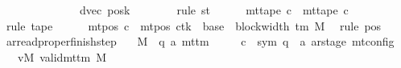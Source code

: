 \begin{isabellebody}
\ \ \ \ \ \ \ \ \ \ \ \ \ \ dvec{\isacharcomma}{\kern0pt}\ {\isacharquery}{\kern0pt}posk{\isacharprime}{\kern0pt}{\isacharparenright}{\kern0pt}{\isachardoublequoteclose}\isanewline
\ \ \ \ \ \ \isamarkupfalse%
\ {\isacharparenleft}{\kern0pt}rule\ st{}{\isacharprime}{\kern0pt}{\isacharparenright}{\kern0pt}\isanewline
\ \ \ \ \isamarkupfalse%
\ {\isachardoublequoteopen}mt{\isacharunderscore}{\kern0pt}tape\ c{}\ {\isacharequal}{\kern0pt}\ mt{\isacharunderscore}{\kern0pt}tape\ c{\isacharprime}{\kern0pt}{\isachardoublequoteclose}\ \isamarkupfalse%
\ {\isacharparenleft}{\kern0pt}rule\ tape{}{\isacharparenright}{\kern0pt}\isanewline
\ \ \ \ \isamarkupfalse%
\ {\isachardoublequoteopen}mt{\isacharunderscore}{\kern0pt}pos\ c{}\ {\isacharequal}{\kern0pt}\ {\isacharparenleft}{\kern0pt}mt{\isacharunderscore}{\kern0pt}pos\ c{\isacharprime}{\kern0pt}{\isacharparenright}{\kern0pt}{\isacharparenleft}{\kern0pt}tk\ {\isacharcolon}{\kern0pt}{\isacharequal}{\kern0pt}\ base\ {\isacharplus}{\kern0pt}\ block{\isacharunderscore}{\kern0pt}width\ {\isacharparenleft}{\kern0pt}{\isasymGamma}{\isacharunderscore}{\kern0pt}tm\ M{\isacharparenright}{\kern0pt}{\isacharparenright}{\kern0pt}{\isachardoublequoteclose}\ \isamarkupfalse%
\ {\isacharparenleft}{\kern0pt}rule\ pos{}{\isacharparenright}{\kern0pt}\isanewline
\ \ \isamarkupfalse%
\isanewline
{}\isamarkupfalse%
%
\endisatagproof
{\isafoldproof}%
%
\isadelimproof
\isanewline
%
\endisadelimproof
\isanewline
{}\isamarkupfalse%
\ ar{\isacharunderscore}{\kern0pt}read{\isacharunderscore}{\kern0pt}proper{\isacharunderscore}{\kern0pt}finish{\isacharunderscore}{\kern0pt}step{\isacharcolon}{\kern0pt}\isanewline
\ \ \ M\ {\isacharcolon}{\kern0pt}{\isacharcolon}{\kern0pt}\ {\isachardoublequoteopen}{\isacharparenleft}{\kern0pt}{\isacharprime}{\kern0pt}q{\isacharcomma}{\kern0pt}\ {\isacharprime}{\kern0pt}a{\isacharparenright}{\kern0pt}\ mttm{\isachardoublequoteclose}\isanewline
\ \ \ \ \ c{\isacharprime}{\kern0pt}\ {\isacharcolon}{\kern0pt}{\isacharcolon}{\kern0pt}\ {\isachardoublequoteopen}{\isacharparenleft}{\kern0pt}sym{}{\isacharcomma}{\kern0pt}\ {\isacharprime}{\kern0pt}q\ {\isasymtimes}\ {\isacharprime}{\kern0pt}a\ ar{\isacharunderscore}{\kern0pt}stage{\isacharparenright}{\kern0pt}\ mt{\isacharunderscore}{\kern0pt}config{\isachardoublequoteclose}\isanewline
\ \ \ vM{\isacharcolon}{\kern0pt}\ {\isachardoublequoteopen}valid{\isacharunderscore}{\kern0pt}mttm\ M{\isachardoublequoteclose}\isanewline

\end{isabellebody}
